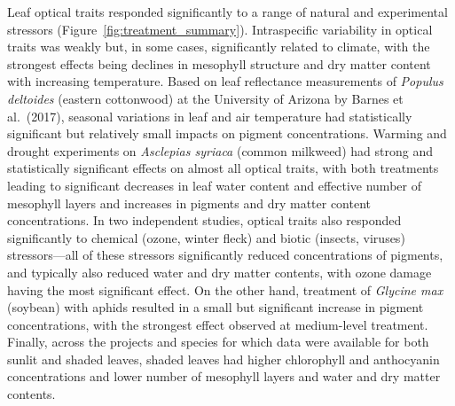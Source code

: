 Leaf optical traits responded significantly to a range of natural and experimental stressors (Figure~\ref{fig:treatment_summary}).
Intraspecific variability in optical traits was weakly but, in some cases, significantly related to climate, with the strongest effects being declines in mesophyll structure and dry matter content with increasing temperature.
Based on leaf reflectance measurements of \textit{Populus deltoides} (eastern cottonwood) at the University of Arizona by Barnes et al.~(2017), \nocite{barnes_2017_beyond}
% 
% 
seasonal variations in leaf and air temperature had statistically significant but relatively small impacts on pigment concentrations.
Warming and drought experiments on \textit{Asclepias syriaca} (common milkweed) had strong and statistically significant effects on almost all optical traits, with both treatments leading to significant decreases in leaf water content and effective number of mesophyll layers and increases in pigments and dry matter content concentrations.
% 
% 
In two independent studies, optical traits also responded significantly to chemical (ozone, winter fleck) and biotic (insects, viruses) stressors---all of these stressors significantly reduced concentrations of pigments, and typically also reduced water and dry matter contents, with ozone damage having the most significant effect.
% 
% 
% 
%
% 
% 
On the other hand, treatment of \textit{Glycine max} (soybean) with aphids resulted in a small but significant increase in pigment concentrations, with the strongest effect observed at medium-level treatment.
Finally, across the projects and species for which data were available for both sunlit and shaded leaves, shaded leaves had higher chlorophyll and anthocyanin concentrations and lower number of mesophyll layers and water and dry matter contents.
% 
% 

